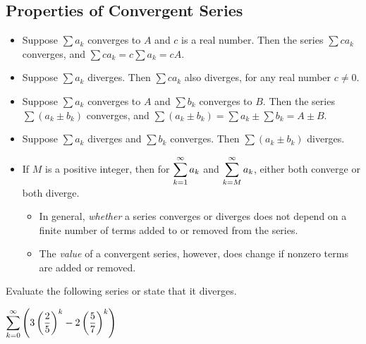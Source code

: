 \documentclass[12pt]{article}
\begin{document}
\subsection*{Properties of Convergent Series}
\begin{itemize}
	\item[\tc{1}] Suppose $\sum a_k$ converges to $A$ and $c$ is a real number. Then the series $\sum c a_k$ converges, and $\sum ca_k=c\sum a_k=cA$.
	\item[\tc{2}] Suppose $\sum a_k$ diverges. Then $\sum ca_k$ also diverges, for any real number $c\neq 0$.
	\item[\tc{3}] Suppose $\sum a_k$ converges to $A$ and $\sum b_k$ converges to $B$. Then the series $\sum(a_k\pm b_k)$ converges, and $\sum(a_k\pm b_k)=\sum a_k\pm \sum b_k=A\pm B$.
	\item[\tc{4}] Suppose $\sum a_k$ diverges and $\sum b_k$ converges. Then $\sum(a_k\pm b_k)$ diverges.
	\item[\tc{5}] If $M$ is a positive integer, then for $\displaystyle\sum_{k=1}^\infty a_k$ and $\displaystyle\sum_{k=M}^\infty a_k$, either both converge or both diverge.
	\begin{itemize}
		\item In general, \textit{whether} a series converges or diverges does not depend on a finite number of terms added to or removed from the series.
		\item The \textit{value} of a convergent series, however, does change if nonzero terms are added or removed.
	\end{itemize}
\end{itemize}

\Example Evaluate the following series or state that it diverges.

\vspace{5mm}

$\displaystyle\sum_{k=0}^\infty \left(3\left(\frac{2}{5}\right)^k-2\left(\frac{5}{7}\right)^k\right)$

\vfill
\end{document}
